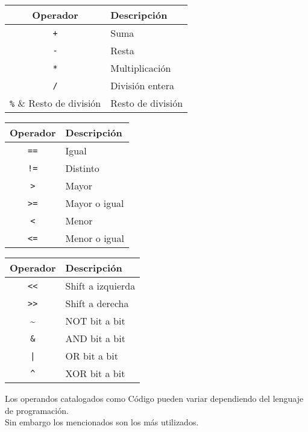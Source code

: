 \documentclass[a4paper,10pt]{article}
\begin{document}
\begin{multicols}{3}
    \begin{tabular}{c|p{2.40cm}}
    \small Operador & \small Descripción\\
    \hline
    \verb|+|  & \small Suma           \\
    \verb|-|  & \small Resta          \\
    \verb|*|  & \small Multiplicación \\
    \verb|/|  & \small División entera \\
    \verb|%|  & \small Resto de división\\ 
    \end{tabular}
\columnbreak
    \begin{tabular}{c|p{2.40cm}}
    \small Operador & \small Descripción\\
    \hline
    \verb|==| & \small Igual          \\
    \verb|!=| & \small Distinto       \\
    \verb|>|  & \small Mayor          \\
    \verb|>=| & \small Mayor o igual    \\
    \verb|<|  & \small Menor          \\
    \verb|<=| & \small Menor o igual    \\
    \end{tabular}
\columnbreak
    \begin{tabular}{c|p{2.40cm}}
    \small Operador & \small Descripción\\
    \hline
    \verb|<<| & \small Shift a izquierda \\
    \verb|>>| & \small Shift a derecha   \\
    \hline
    \textasciitilde  & \small NOT bit a bit  \\
    \verb|&|  & \small AND bit a bit  \\
    \verb.|.  & \small OR bit a bit   \\
    \verb|^|  & \small XOR bit a bit  \\
    \end{tabular}
\end{multicols}

Los operandos catalogados como Código pueden variar dependiendo del lenguaje de programación.\\
Sin embargo los mencionados son los más utilizados.
\end{document}

